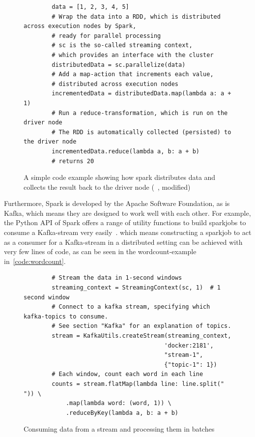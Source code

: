 \begin{figure}
    \caption{A simple code example showing how spark distributes data and collects the result back to the driver node (~\cite{sparkDocs}, modified)}
    \label{code:simpleParallelization}
    \begin{verbatim}
        data = [1, 2, 3, 4, 5]
        # Wrap the data into a RDD, which is distributed across execution nodes by Spark,
        # ready for parallel processing
        # sc is the so-called streaming context,
        # which provides an interface with the cluster
        distributedData = sc.parallelize(data)
        # Add a map-action that increments each value,
        # distributed across execution nodes
        incrementedData = distributedData.map(lambda a: a + 1)
        # Run a reduce-transformation, which is run on the driver node
        # The RDD is automatically collected (persisted) to the driver node
        incrementedData.reduce(lambda a, b: a + b)
        # returns 20
    \end{verbatim}
\end{figure}

Furthermore, Spark is developed by the Apache Software Foundation, as is Kafka,
which means they are designed to work well with each other.
For example, the Python API of Spark offers a range of utility functions to build sparkjobs to consume a Kafka-stream very easily~\cite{sparkDocs}.
which means constructing a sparkjob to act as a consumer for a Kafka-stream in a distributed setting can be achieved with very few lines of code,
as can be seen in the wordcount-example in~\autoref{code:wordcount}.

\begin{figure}
    \caption{Consuming data from a stream and processing them in batches}
    \label{code:wordcount}
    \begin{verbatim}
        # Stream the data in 1-second windows
        streaming_context = StreamingContext(sc, 1)  # 1 second window
        # Connect to a kafka stream, specifying which kafka-topics to consume.
        # See section "Kafka" for an explanation of topics.
        stream = KafkaUtils.createStream(streaming_context,
                                        'docker:2181',
                                        "stream-1",
                                        {"topic-1": 1})
        # Each window, count each word in each line
        counts = stream.flatMap(lambda line: line.split(" ")) \
            .map(lambda word: (word, 1)) \
            .reduceByKey(lambda a, b: a + b)
    \end{verbatim}
\end{figure}


